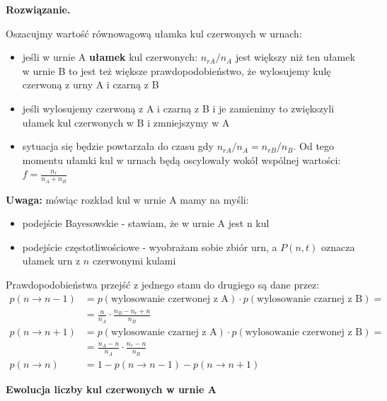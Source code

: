 \documentclass[11pt,a4paper]{article}
\newenvironment{solution}{\vspace{1cm} \par\textbf{Rozwiązanie.} \vspace{1cm}}{}
\begin{document}
\begin{solution}

Oszacujmy wartość równowagową ułamka kul czerwonych w urnach:
\begin{itemize}
  \item jeśli w urnie A {\bf ułamek} kul czerwonych:  $n_{rA}/n_A$
        jest większy niż ten ułamek w urnie B to jest też większe prawdopodobieństwo,
        że wylosujemy kulę czerwoną z urny A i czarną z B
  \item jeśli wylosujemy czerwoną z A i czarną z B i je zamienimy to zwiększyli 
        ułamek kul czerwonych w B i zmniejszymy w A
  \item sytuacja się będzie powtarzała do czasu gdy $n_{rA}/n_A = n_{rB}/n_B$. 
        Od tego momentu ułamki kul w urnach będą oscylowały wokół wspólnej wartości:
        $f = \frac{n_{r}}{n_A + n_B}$
\end{itemize}
        
\vspace{0.5cm}

{\bf Uwaga:} mówiąc rozkład kul w urnie A mamy na myśli:
\begin{itemize}
  \item podejście Bayesowskie - stawiam, że w urnie A jest n kul
  \item podejście częstotliwościowe - wyobrażam sobie zbiór urn, a $P(n,t)$
        oznacza ułamek urn z $n$ czerwonymi kulami
\end{itemize}  

\vspace{0.5cm}

Prawdopodobieństwa przejść z jednego stanu do drugiego są dane przez:
\begin{align*}
  p(n \to n-1) &= p(\text{wylosowanie czerwonej z A}) \cdot
                  p(\text{wylosowanie czarnej z B}) = \\
                &= \frac{n}{n_A} \cdot \frac{n_B - n_r + n}{n_B} \\
  p(n \to n+1) &= p(\text{wylosowanie czarnej z A}) \cdot
                  p(\text{wylosowanie czerwonej z B}) = \\
                &= \frac{n_A - n}{n_A} \cdot \frac{n_r - n}{n_B} \\
  p(n \to n) &= 1 - p(n \to n-1) - p(n \to n+1) 
\end{align*}

\newpage
{\bf Ewolucja liczby kul czerwonych w urnie A}\\


\end{solution}
\end{document}
